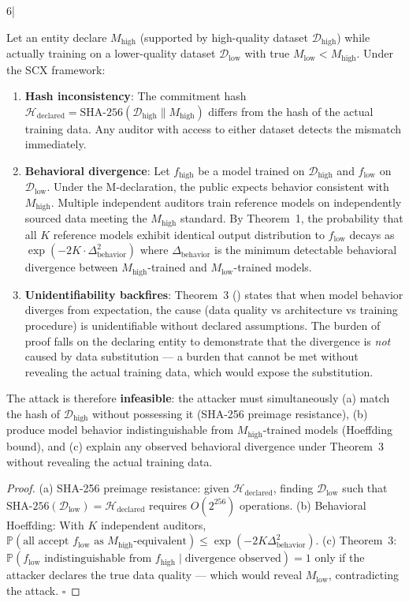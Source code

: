 6|\documentclass[12pt,a4paper]{article}
\begin{document}
\begin{theorem}[ ()]
\label{thm:substitution}
\rigorFull
Let an entity declare $M_{\text{high}}$ (supported by high-quality dataset $\mathcal{D}_{\text{high}}$) while actually training on a lower-quality dataset $\mathcal{D}_{\text{low}}$ with true $M_{\text{low}} < M_{\text{high}}$. Under the SCX framework:
\begin{enumerate}[label=(\roman*)]
    \item \textbf{Hash inconsistency}: The commitment hash $\mathcal{H}_{\text{declared}} = \text{SHA-256}(\mathcal{D}_{\text{high}} \| M_{\text{high}})$ differs from the hash of the actual training data. Any auditor with access to either dataset detects the mismatch immediately.
    \item \textbf{Behavioral divergence}: Let $f_{\text{high}}$ be a model trained on $\mathcal{D}_{\text{high}}$ and $f_{\text{low}}$ on $\mathcal{D}_{\text{low}}$. Under the M-declaration, the public expects behavior consistent with $M_{\text{high}}$. Multiple independent auditors train reference models on independently sourced data meeting the $M_{\text{high}}$ standard. By Theorem~1, the probability that all $K$ reference models exhibit identical output distribution to $f_{\text{low}}$ decays as $\exp(-2K \cdot \Delta_{\text{behavior}}^2)$ where $\Delta_{\text{behavior}}$ is the minimum detectable behavioral divergence between $M_{\text{high}}$-trained and $M_{\text{low}}$-trained models.
    \item \textbf{Unidentifiability backfires}: Theorem~3 () states that when model behavior diverges from expectation, the cause (data quality vs architecture vs training procedure) is unidentifiable without declared assumptions. The burden of proof falls on the declaring entity to demonstrate that the divergence is \emph{not} caused by data substitution — a burden that cannot be met without revealing the actual training data, which would expose the substitution.
\end{enumerate}
The attack is therefore \textbf{infeasible}: the attacker must simultaneously (a) match the hash of $\mathcal{D}_{\text{high}}$ without possessing it (SHA-256 preimage resistance), (b) produce model behavior indistinguishable from $M_{\text{high}}$-trained models (Hoeffding bound), and (c) explain any observed behavioral divergence under Theorem~3 without revealing the actual training data.
\end{theorem}

\begin{proof}
(a) SHA-256 preimage resistance: given $\mathcal{H}_{\text{declared}}$, finding $\mathcal{D}_{\text{low}}$ such that $\text{SHA-256}(\mathcal{D}_{\text{low}}) = \mathcal{H}_{\text{declared}}$ requires $O(2^{256})$ operations. (b) Behavioral Hoeffding: With $K$ independent auditors, $\mathbb{P}(\text{all accept } f_{\text{low}} \text{ as } M_{\text{high}}\text{-equivalent}) \le \exp(-2K\Delta_{\text{behavior}}^2)$. (c) Theorem~3: $\mathbb{P}(f_{\text{low}} \text{ indistinguishable from } f_{\text{high}} \mid \text{divergence observed}) = 1$ only if the attacker declares the true data quality — which would reveal $M_{\text{low}}$, contradicting the attack. $\square$
\end{proof}
\end{document}
